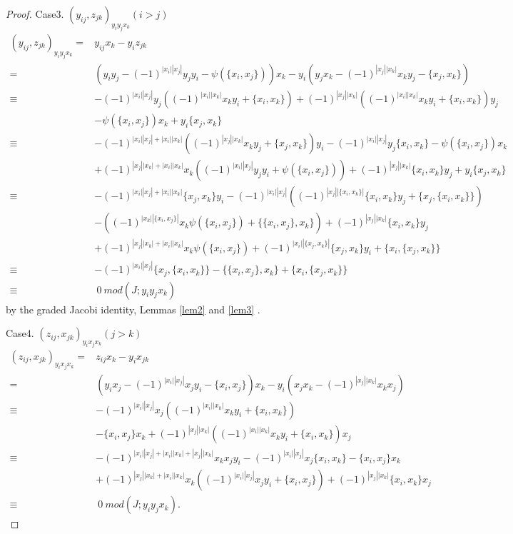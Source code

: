 \documentclass[a4paper,10pt]{amsart}
\theoremstyle{definition}
\theoremstyle{remark}
\numberwithin{equation}{section}
\begin{document}
\begin{proof}
Case3. $(y_{ij}, z_{jk})_{y_iy_jx_k}(i>j)$
\begin{align*}
(y_{ij}, z_{jk})_{y_iy_jx_k}=&y_{ij}x_k-y_iz_{jk}\\
=&(y_iy_j-(-1)^{|x_i||x_j|}y_jy_i-\psi(\{x_i, x_j\}))x_k-y_i(
y_jx_k-(-1)^{|x_j||x_k|}x_ky_j-\{x_j, x_k\})\\
\equiv&-(-1)^{|x_i||x_j|}y_j((-1)^{|x_i||x_k|}x_ky_i+\{x_i, x_k\})+(-1)^{|x_j||x_k|}((-1)^{|x_i||x_k|}x_ky_i+\{x_i, x_k\})y_j\\
&-\psi(\{x_i, x_j\})x_k+y_i\{x_j, x_k\}\\
\equiv&-(-1)^{|x_i||x_j|+|x_i||x_k|}((-1)^{|x_j||x_k|}x_ky_j+\{x_j,
x_k\})y_i-(-1)^{|x_i||x_j|}y_j\{x_i, x_k\}-\psi(\{x_i, x_j\})x_k\\
&+(-1)^{|x_j||x_k|+|x_i||x_k|}x_k((-1)^{|x_i||x_j|}y_jy_i+\psi(\{x_i,
x_j\}))+(-1)^{|x_j||x_k|}\{x_i, x_k\}y_j+y_i\{x_j, x_k\}\\
\equiv&-(-1)^{|x_i||x_j|+|x_i||x_k|}\{x_j,
x_k\}y_i-(-1)^{|x_i||x_j|}((-1)^{|x_j||\{x_i, x_k\}|}\{x_i, x_k\}y_j+\{x_j, \{x_i, x_k\}\})\\
&-((-1)^{|x_k||\{x_i, x_j\}|}x_k\psi(\{x_i, x_j\})+\{\{x_i, x_j\}, x_k\})+(-1)^{|x_j||x_k|}\{x_i, x_k\}y_j\\
&+(-1)^{|x_j||x_k|+|x_i||x_k|}x_k\psi(\{x_i,
x_j\})+(-1)^{|x_i||\{x_j, x_k\}|}\{x_j, x_k\}y_i+\{x_i, \{x_j, x_k\}\}\\
\equiv&-(-1)^{|x_i||x_j|}\{x_j, \{x_i, x_k\}\}-\{\{x_i, x_j\},
x_k\}+\{x_i, \{x_j, x_k\}\}\\
\equiv& ~0 ~mod (J; y_iy_jx_k)
\end{align*}
by the graded Jacobi identity, Lemmas \ref{lem2} and \ref{lem3} .

Case4. $(z_{ij}, x_{jk})_{y_ix_jx_k}(j>k)$
\begin{align*}
(z_{ij}, x_{jk})_{y_ix_jx_k}=&z_{ij}x_k-y_ix_{jk}\\
=&(y_ix_j-(-1)^{|x_i||x_j|}x_jy_i-\{x_i, x_j\})x_k-y_i(
x_jx_k-(-1)^{|x_j||x_k|}x_kx_j)\\
\equiv&-(-1)^{|x_i||x_j|}x_j((-1)^{|x_i||x_k|}x_ky_i+\{x_i,
x_k\})\\
&-\{x_i, x_j\}x_k+(-1)^{|x_j||x_k|}((-1)^{|x_i||x_k|}x_ky_i+\{x_i, x_k\})x_j\\
\equiv&-(-1)^{|x_i||x_j|+|x_i||x_k|+|x_j||x_k|}x_kx_jy_i-(-1)^{|x_i||x_j|}x_j\{x_i,
x_k\}-\{x_i, x_j\}x_k\\
&+(-1)^{|x_j||x_k|+|x_i||x_k|}x_k((-1)^{|x_i||x_j|}x_jy_i+\{x_i, x_j\})+(-1)^{|x_j||x_k|}\{x_i, x_k\}x_j\\
\equiv& ~0 ~mod (J; y_iy_jx_k).
\end{align*}
\end{proof}
\end{document}
